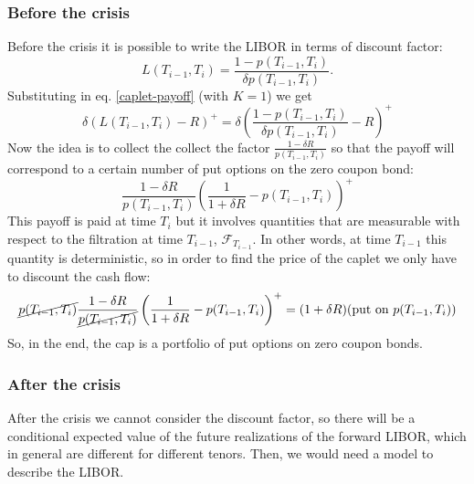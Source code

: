 \subsubsection{Before the crisis}
Before the crisis it is possible to write the LIBOR in terms of discount factor:
\begin{equation*}
    L(T_{i-1},T_i) = \frac{1-p(T_{i-1},T_i)}{\delta p(T_{i-1},T_i)}.
\end{equation*}
Substituting in eq. \eqref{caplet-payoff} (with $K=1$) we get
\begin{equation*}
    \delta(L(T_{i-1},T_i)-R)^+ = \delta\left(\frac{1-p(T_{i-1},T_i)}{\delta p(T_{i-1},T_i)}-R\right)^+
\end{equation*}
Now the idea is to collect the collect the factor $\frac{1-\delta R}{p(T_{i-1},T_i)}$ so that the payoff will correspond to a certain number of put options on the zero coupon bond:
\begin{equation}
    \frac{1-\delta R}{p(T_{i-1},T_i)}\left(\frac{1}{1+\delta R} - p(T_{i-1},T_i)\right)^+
\end{equation}
This payoff is paid at time $T_i$ but it involves quantities that are measurable with respect to the filtration at time $T_{i-1}$, $\mathcal{F}_{T_{i-1}}$. In other words, at time $T_{i-1}$ this quantity is deterministic, so in order to find the price of the caplet we only have to discount the cash flow:
\begin{equation}
    \cancel{p(T_{i-1},T_i)}\frac{1-\delta R}{\cancel{p(T_{i-1},T_i)}}\left(\frac{1}{1+\delta R}-p(T_{i-1},T_i)\right)^+ = (1+\delta R)(\text{put on } p(T_{i-1},T_i))
\end{equation}
So, in the end, the cap is a portfolio of put options on zero coupon bonds. %

\subsubsection{After the crisis}
After the crisis we cannot consider the discount factor, so there will be a conditional expected value of the future realizations of the forward LIBOR, which in general are different for different tenors. Then, we would need a model to describe the LIBOR.

